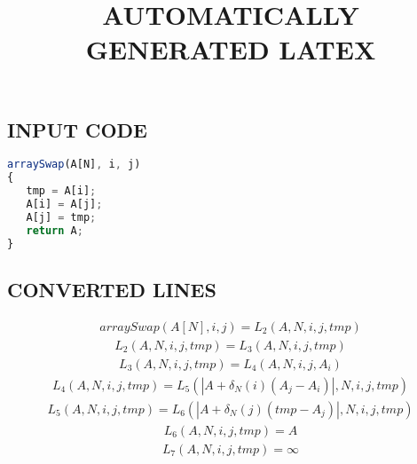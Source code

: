 \documentclass{article}
\begin{document}
\title{AUTOMATICALLY GENERATED LATEX}
\maketitle

\subsection{INPUT CODE}
\begin{lstlisting}[language=JavaScript]
arraySwap(A[N], i, j)
{
   tmp = A[i];
   A[i] = A[j];
   A[j] = tmp;
   return A;
}

\end{lstlisting}

\subsection{CONVERTED LINES}
\begin{equation*}\begin{split}
arraySwap\left(A[N],i,j\right) = L_{2}\left(A,N,i,j,tmp\right)
\end{split}\end{equation*}
\begin{equation*}\begin{split}
L_{2}\left(A,N,i,j,tmp\right) = L_{3}\left(A,N,i,j,tmp\right)
\end{split}\end{equation*}
\begin{equation*}\begin{split}
L_{3}\left(A,N,i,j,tmp\right) = L_{4}\left(A,N,i,j,A_{i}\right)
\end{split}\end{equation*}
\begin{equation*}\begin{split}
L_{4}\left(A,N,i,j,tmp\right) = L_{5}\left( |A + \delta_{N}\left(i\right)\left(A_{j} - A_{i}\right)| ,N,i,j,tmp\right)
\end{split}\end{equation*}
\begin{equation*}\begin{split}
L_{5}\left(A,N,i,j,tmp\right) = L_{6}\left( |A + \delta_{N}\left(j\right)\left(tmp - A_{j}\right)| ,N,i,j,tmp\right)
\end{split}\end{equation*}
\begin{equation*}\begin{split}
L_{6}\left(A,N,i,j,tmp\right) = A
\end{split}\end{equation*}
\begin{equation*}\begin{split}
L_{7}\left(A,N,i,j,tmp\right) = \infty
\end{split}\end{equation*}
\end{document}
